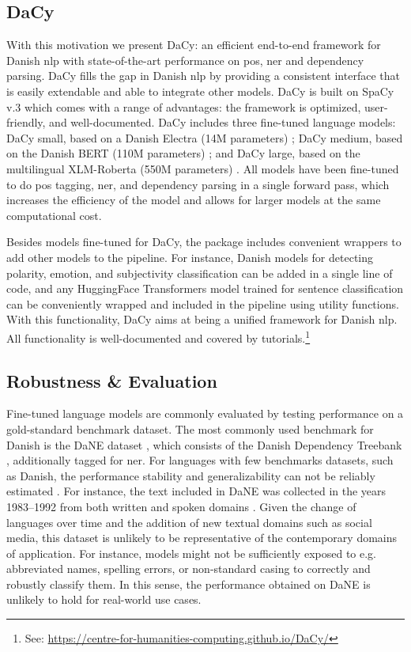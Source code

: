 \documentclass{article}
\begin{document}
\subsection{DaCy}
With this motivation we present DaCy: an efficient end-to-end framework for Danish \gls{nlp} with state-of-the-art performance on \gls{pos}, \gls{ner} and dependency parsing. DaCy fills the gap in Danish \gls{nlp} by providing a consistent interface that is easily extendable and able to integrate other models. DaCy is built on SpaCy v.3 which comes with a range of advantages: the framework is optimized, user-friendly, and well-documented. DaCy includes three fine-tuned language models: DaCy small, based on a Danish Electra (14M parameters) \parencite{hojmark-bertelsen_aelaectra_2021}; DaCy medium, based on the Danish BERT (110M parameters) \parencite{mollerhoj_danish_2019}; and DaCy large, based on the multilingual XLM-Roberta (550M parameters) \parencite{conneau_unsupervised_2020}. All models have been fine-tuned to do \gls{pos} tagging, \gls{ner}, and dependency parsing in a single forward pass, which increases the efficiency of the model and allows for larger models at the same computational cost.

Besides models fine-tuned for DaCy, the package includes convenient wrappers to add other models to the pipeline. For instance, Danish models for detecting polarity, emotion, and subjectivity classification can be added in a single line of code, and any HuggingFace Transformers \parencite{wolf_huggingfaces_2020} model trained for sentence classification can be conveniently wrapped and included in the pipeline using utility functions. With this functionality, DaCy aims at being a unified framework for Danish \gls{nlp}. All functionality is well-documented and covered by tutorials.\footnote{See: \url{https://centre-for-humanities-computing.github.io/DaCy/}}

\subsection{Robustness \& Evaluation}
Fine-tuned language models are commonly evaluated by testing performance on a gold-standard benchmark dataset. The most commonly used benchmark for Danish is the DaNE dataset \parencite{hvingelby_dane_2020}, which consists of the Danish Dependency Treebank \parencite{johannsen_universal_2015}, additionally tagged for \gls{ner}. For languages with few benchmarks datasets, such as Danish, the performance stability and generalizability can not be reliably estimated \parencite{ribeiro_beyond_2020}. For instance, the text included in DaNE was collected in the years 1983–1992 from both written and spoken domains \parencite{hvingelby_dane_2020}. Given the change of languages over time and the addition of new textual domains such as social media, this dataset is unlikely to be representative of the contemporary domains of application. For instance, models might not be sufficiently exposed to e.g. abbreviated names, spelling errors, or non-standard casing to correctly and robustly classify them. In this sense, the performance obtained on DaNE is unlikely to hold for real-world use cases.
\end{document}
